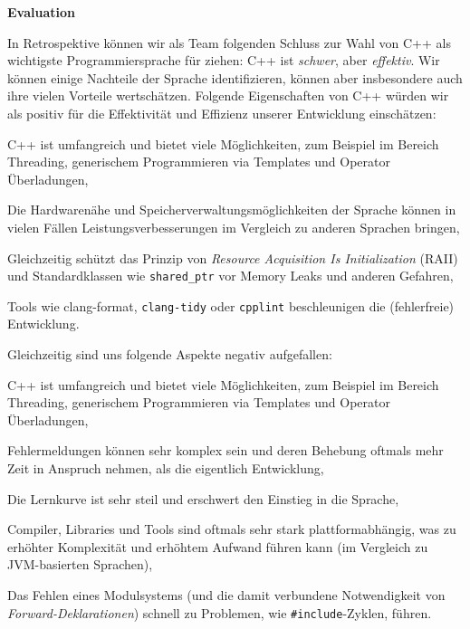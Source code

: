 \textbf{Evaluation}

In Retrospektive können wir als Team folgenden Schluss zur Wahl von C++ als
wichtigste Programmiersprache für \erasim{} ziehen: C++ ist \emph{schwer},
aber \emph{effektiv}. Wir können einige Nachteile der Sprache identifizieren,
können aber insbesondere auch ihre vielen Vorteile wertschätzen. Folgende
Eigenschaften von C++ würden wir als positiv für die Effektivität und Effizienz
unserer Entwicklung einschätzen:
\begin{sitemize}{-0.45cm}
  \item C++ ist umfangreich und bietet viele Möglichkeiten, zum Beispiel im
  Bereich Threading, generischem Programmieren via Templates und Operator
  Überladungen,
  \item Die Hardwarenähe und Speicherverwaltungsmöglichkeiten der Sprache können
  in vielen Fällen Leistungsverbesserungen im Vergleich zu anderen Sprachen
  bringen,
  \item Gleichzeitig schützt das Prinzip von \emph{Resource Acquisition Is
  Initialization} (RAII) und Standardklassen wie \texttt{shared\_ptr} vor Memory
  Leaks und anderen Gefahren,
  \item Tools wie {\ttfamily\small clang-format}, \texttt{clang-tidy} oder
  \texttt{cpplint} beschleunigen die (fehlerfreie) Entwicklung.
  \vspace{-0.35cm}
\end{sitemize}

Gleichzeitig sind uns folgende Aspekte negativ aufgefallen:
\begin{sitemize}{-0.4cm}
  \item C++ ist umfangreich und bietet viele Möglichkeiten, zum Beispiel im
  Bereich Threading, generischem Programmieren via Templates und Operator
  Überladungen,
  \item Fehlermeldungen können sehr komplex sein und deren Behebung oftmals mehr
  Zeit in Anspruch nehmen, als die eigentlich Entwicklung,
  \item Die Lernkurve ist sehr steil und erschwert den Einstieg in die Sprache,
  \item Compiler, Libraries und Tools sind oftmals sehr stark plattformabhängig,
  was zu erhöhter Komplexität und erhöhtem Aufwand führen kann (im Vergleich
  zu JVM-basierten Sprachen),
  \item Das Fehlen eines Modulsystems (und die damit verbundene Notwendigkeit
  von \emph{Forward-Deklarationen}) schnell zu Problemen, wie
  \texttt{\#include}-Zyklen, führen.
  \vspace{0.3cm}
\end{sitemize}
